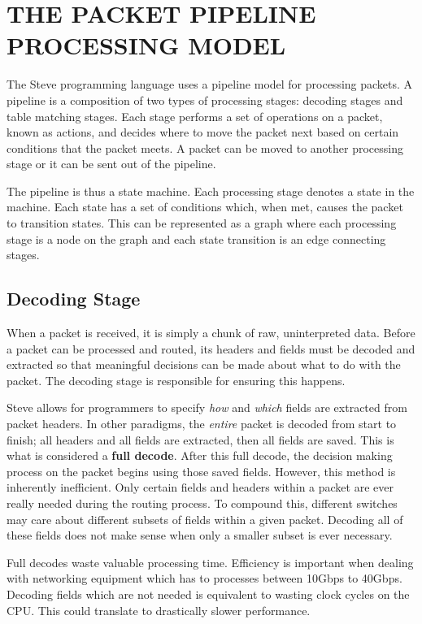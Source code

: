 \chapter{THE PACKET PIPELINE PROCESSING MODEL} \label{pipeline_model}

The Steve programming language uses a pipeline model for processing packets. A pipeline is a composition of two types of processing stages: decoding stages and table matching stages. Each stage performs a set of operations on a packet, known as actions, and decides where to move the packet next based on certain conditions that the packet meets. A packet can be moved to another processing stage or it can be sent out of the pipeline.

The pipeline is thus a state machine. Each processing stage denotes a state in the machine. Each state has a set of conditions which, when met, causes the packet to transition states. This can be represented as a graph where each processing stage is a node on the graph and each state transition is an edge connecting stages.

\section{Decoding Stage}

When a packet is received, it is simply a chunk of raw, uninterpreted data. Before a packet can be processed and routed, its headers and fields must be decoded and extracted so that meaningful decisions can be made about what to do with the packet. The decoding stage is responsible for ensuring this happens.

Steve allows for programmers to specify \textit{how} and \textit{which} fields are extracted from packet headers. In other paradigms, the \textit{entire} packet is decoded from start to finish; all headers and all fields are extracted, then all fields are saved. This is what is considered a \textbf{full decode}. After this full decode, the decision making process on the packet begins using those saved fields. However, this method is inherently inefficient. Only certain fields and headers within a packet are ever really needed during the routing process. To compound this, different switches may care about different subsets of fields within a given packet. Decoding all of these fields does not make sense when only a smaller subset is ever necessary. 

Full decodes waste valuable processing time. Efficiency is important when dealing with networking equipment which has to processes between 10Gbps to 40Gbps. Decoding fields which are not needed is equivalent to wasting clock cycles on the CPU. This could translate to drastically slower performance.

